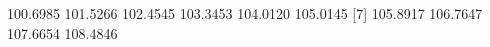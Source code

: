 \begin{Schunk}
% --begin: "frbe"
\begin{Soutput}
 [1] 100.6985 101.5266 102.4545 103.3453 104.0120 105.0145
 [7] 105.8917 106.7647 107.6654 108.4846
\end{Soutput}
%
% --end: "frbe"
\end{Schunk}
